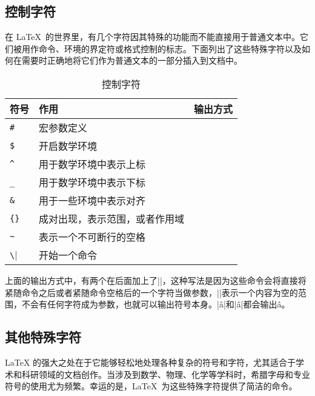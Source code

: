 {\subsection{控制字符}
在 \LaTeX\ 的世界里，有几个字符因其特殊的功能而不能直接用于普通文本中。它们被用作命令、环境的界定符或格式控制的标志。下面列出了这些特殊字符以及如何在需要时正确地将它们作为普通文本的一部分插入到文档中。
\begin{table}[H]
	\centering
	\begin{tabular}{lll} \toprule
		符号      & 作用                           & 输出方式                   \\ \midrule
		\verb|#|  & 宏参数定义                     & \texinline{\#}             \\
		\verb|$|  & 开启数学环境                   & \texinline{\$}             \\
		\verb|^|  & 用于数学环境中表示上标         & \texinline{\^{}}           \\
		\verb|_|  & 用于数学环境中表示下标         & \texinline{\_}             \\
		\verb|&|  & 用于一些环境中表示对齐         & \texinline{\&}             \\
		\verb|{}| & 成对出现，表示范围，或者作用域 & \texinline{\{ \}}          \\
		\verb|~|  & 表示一个不可断行的空格         & \texinline{\~{}}           \\
		\verb|\|  & 开始一个命令                   & \texinline{\textbackslash} \\ \bottomrule
	\end{tabular}
	\caption{控制字符}
\end{table}

上面的输出方式中，有两个在后面加上了\texinline|{}|，这种写法是因为这些命令会将直接将紧随命令之后或者紧随命令空格后的一个字符当做参数，\texinline|{}|表示一个内容为空的范围，不会有任何字符成为参数，也就可以输出符号本身。\texinline|\^ a|和\texinline|\^a|都会输出\^a。
\subsection{其他特殊字符}
\LaTeX
的强大之处在于它能够轻松地处理各种复杂的符号和字符，尤其适合于学术和科研领域的文档创作。当涉及到数学、物理、化学等学科时，希腊字母和专业符号的使用尤为频繁。幸运的是，\LaTeX\ 为这些特殊字符提供了简洁的命令。
}
